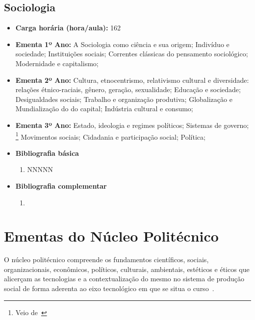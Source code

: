 \documentclass[11pt,fleqn]{book} %
\newcommand{\VER}[1]{\begingroup\color{red}#1\endgroup}
\begin{document}
\newpage
\subsection{Sociologia}\label{disc:sociologia}
\begin{itemize}
	\item \textbf{Carga horária (hora/aula):} 162
	\item \textbf{Ementa 1º Ano:} 
	A Sociologia como ciência e sua origem; 
	Indivíduo e sociedade; 
	Instituições sociais; 
	Correntes clássicas do pensamento sociológico; 
	Modernidade e capitalismo;
	\item \textbf{Ementa 2º Ano:} 
	Cultura, etnocentrismo, relativismo cultural e diversidade: relações étnico-raciais, gênero, geração, sexualidade;
	Educação e sociedade; 
	Desigualdades sociais; 
	Trabalho e organização produtiva; 
	Globalização e Mundialização do do capital; 
	Indústria cultural e consumo;
	\item \textbf{Ementa 3º Ano:} 
	\VER{	
	Estado, ideologia e regimes políticos; 
	Sistemas de governo;
	}\footnote{Veio de~} 
	Movimentos sociais;
	Cidadania e participação social;
	Política;
	\item \textbf{Bibliografia básica}
	\begin{enumerate}
		\item NNNNN
	\end{enumerate}
	\item \textbf{Bibliografia complementar}
	\begin{enumerate}
		\item 
	\end{enumerate}	
\end{itemize}

\newpage
\section{Ementas do Núcleo Politécnico}\label{ementasPolitecnico}
\indent

O núcleo politécnico compreende os fundamentos científicos, sociais, organizacionais, econômicos, políticos, culturais, ambientais, estéticos e éticos que alicerçam as tecnologias e a contextualização do mesmo no sistema de produção social de forma aderenta ao eixo tecnológico em que se situa o curso~\cite{Resolucao06De2012}.


\newpage
\end{document}
